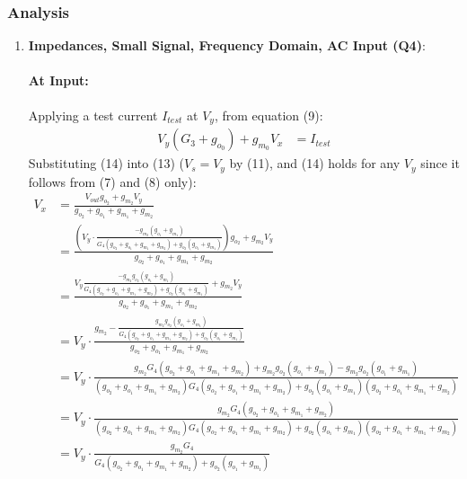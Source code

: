 \subsubsection{Analysis}
\begin{enumerate}
  \item \textbf{Impedances, Small Signal, Frequency Domain, AC Input (Q4)}:
    \paragraph{At Input:} Applying a test current $I_{test}$
      at $V_{y}$, from equation (9):
      \begin{align*}
        V_{y}(G_3 + g_{o_0}) + g_{m_0}V_{x} &= I_{test}
      \end{align*}
      Substituting (14) into (13) (\(V_s = V_y\) by (11), and (14) holds for
      any \(V_y\) since it follows from (7) and (8) only):
      \begin{align*}
        V_{x} &= \frac{V_{out}g_{o_2} + g_{m_2}V_{y}}{g_{o_2} + g_{o_1} + g_{m_1} + g_{m_2}} \\
              &= \frac{\left(V_{y} \cdot \frac{-g_{m_2}(g_{o_1} + g_{m_1})}{G_4(g_{o_2} + g_{o_1} + g_{m_1} + g_{m_2}) + g_{o_2}(g_{o_1} + g_{m_1})}\right)g_{o_2} + g_{m_2}V_{y}}{g_{o_2} + g_{o_1} + g_{m_1} + g_{m_2}} \\
              &= \frac{V_{y}\frac{-g_{m_2}g_{o_2}(g_{o_1} + g_{m_1})}{G_4(g_{o_2} + g_{o_1} + g_{m_1} + g_{m_2}) + g_{o_2}(g_{o_1} + g_{m_1})} + g_{m_2}V_{y}}{g_{o_2} + g_{o_1} + g_{m_1} + g_{m_2}} \\
              &= V_{y} \cdot \frac{g_{m_2} - \frac{g_{m_2}g_{o_2}(g_{o_1} + g_{m_1})}{G_4(g_{o_2} + g_{o_1} + g_{m_1} + g_{m_2}) + g_{o_2}(g_{o_1} + g_{m_1})}}{g_{o_2} + g_{o_1} + g_{m_1} + g_{m_2}} \\
              &= V_{y} \cdot \frac{g_{m_2}G_4(g_{o_2} + g_{o_1} + g_{m_1} + g_{m_2}) + g_{m_2}g_{o_2}(g_{o_1} + g_{m_1}) - g_{m_2}g_{o_2}(g_{o_1} + g_{m_1})}{(g_{o_2} + g_{o_1} + g_{m_1} + g_{m_2})G_4(g_{o_2} + g_{o_1} + g_{m_1} + g_{m_2}) + g_{o_2}(g_{o_1} + g_{m_1})(g_{o_2} + g_{o_1} + g_{m_1} + g_{m_2})} \\
              &= V_{y} \cdot \frac{g_{m_2}G_4(g_{o_2} + g_{o_1} + g_{m_1} + g_{m_2})}{(g_{o_2} + g_{o_1} + g_{m_1} + g_{m_2})G_4(g_{o_2} + g_{o_1} + g_{m_1} + g_{m_2}) + g_{o_2}(g_{o_1} + g_{m_1})(g_{o_2} + g_{o_1} + g_{m_1} + g_{m_2})} \\
              &= V_{y} \cdot \frac{g_{m_2}G_4}{G_4(g_{o_2} + g_{o_1} + g_{m_1} + g_{m_2}) + g_{o_2}(g_{o_1} + g_{m_1})} \tag{15}

\end{align*}
\end{enumerate}
